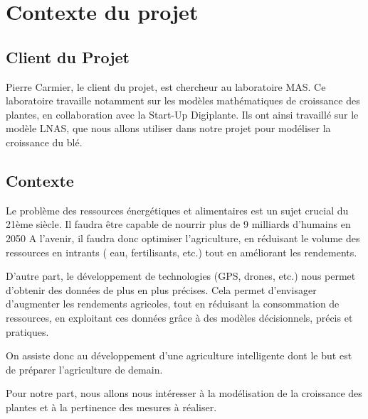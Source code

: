 \section{Contexte du projet}

\subsection{Client du Projet}
Pierre Carmier, le client du projet, est chercheur au laboratoire MAS. Ce laboratoire travaille notamment sur les modèles mathématiques de croissance des plantes, en collaboration avec la Start-Up Digiplante. Ils ont ainsi travaillé sur le modèle LNAS, que nous allons utiliser dans notre projet pour modéliser la croissance du blé.
\subsection{Contexte}
Le problème des ressources énergétiques et alimentaires est un sujet crucial du  21ème siècle. Il faudra être capable de nourrir plus de 9 milliards d'humains en 2050
A l'avenir, il faudra donc optimiser l'agriculture, en réduisant le volume des ressources en intrants ( eau, fertilisants, etc.) tout en améliorant les rendements.

D'autre part, le développement de technologies (GPS, drones, etc.) nous permet d'obtenir des données de plus en plus précises. 
Cela permet d'envisager d'augmenter les rendements agricoles, tout en réduisant la consommation de ressources, en exploitant ces données grâce à des modèles décisionnels, précis et pratiques. 

On assiste donc au développement d'une agriculture intelligente dont le but est de préparer
l'agriculture de demain.

Pour notre part, nous allons nous intéresser à la modélisation de la croissance des plantes et à la pertinence des mesures à réaliser.
